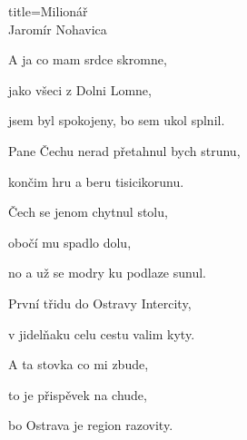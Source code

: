 \begin{song}{title=\centering Milionář \\\normalsize Jaromír Nohavica  \vspace*{-0.3cm}}
{\begin{minipage}[t]{0.5\textwidth}
A ja co mam srdce skromne, 

jako všeci z Dolni Lomne, 

jsem byl spokojeny, bo sem ukol splnil. 

\sloka
Pane Čechu nerad přetahnul bych strunu, 

končim hru a beru tisicikorunu. 

Čech se jenom chytnul stolu, 

obočí mu spadlo dolu, 

no a už se modry ku podlaze sunul. 

\sloka
První třidu do Ostravy Intercity, 

v jidelňaku celu cestu valim kyty.

A ta stovka co mi zbude, 

to je přispěvek na chude, 

bo Ostrava je region razovity.


\end{minipage}
}
\setcounter{Slokočet}{0}
\end{song}
